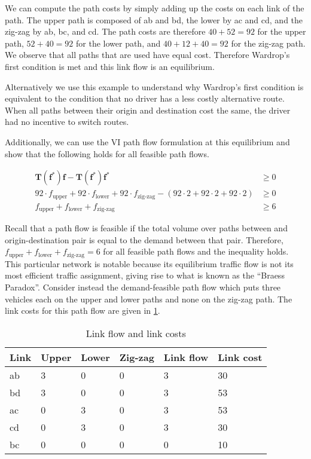 We can compute the path costs by simply adding up the costs on each link of the path.
The upper path is composed of ab and bd, the lower by ac and cd, and the zig-zag by ab, bc, and cd.
The path costs are therefore $40+52=92$ for the upper path, $52+40=92$ for the lower path, and $40+12+40=92$ for the zig-zag path.
We observe that all paths that are used have equal cost.
Therefore Wardrop's first condition is met and this link flow is an equilibrium.

Alternatively we use this example to understand why Wardrop's first condition is equivalent to the condition that no driver has a less costly alternative route.
When all paths between their origin and destination cost the same, the driver had no incentive to switch routes.

Additionally, we can use the VI path flow formulation at this equilibrium and show that the following holds for all feasible path flows.

\begin{align*}
    \mathbf{T}(\mathbf{f}^*)\mathbf{f} - \mathbf{T}(\mathbf{f}^*)\mathbf{f}^* &\geq 0\\
    92\cdot f_{\text{upper}} + 92\cdot f_{\text{lower}} + 92 \cdot f_{\text{zig-zag}} - (92\cdot 2 + 92\cdot 2 + 92\cdot 2) &\geq 0\\
    f_{\text{upper}} + f_{\text{lower}} + f_{\text{zig-zag}} &\geq 6
\end{align*}

Recall that a path flow is feasible if the total volume over paths between and origin-destination pair is equal to the demand between that pair.
Therefore, $f_{\text{upper}} + f_{\text{lower}} + f_{\text{zig-zag}}=6$ for all feasible path flows and the inequality holds.\\


This particular network is notable because its equilibrium traffic flow is not its most efficient traffic assignment, giving rise to what is known as the ``Braess Paradox''.
Consider instead the demand-feasible path flow which puts three vehicles each on the upper and lower paths and none on the zig-zag path.
The link costs for this path flow are given in \cref{tab:braess:optimal-costs}.

\begin{table}[!ht]
\centering
\caption{Link flow and link costs}\label{tab:braess:optimal-costs}
\begin{tabular}{@{}l|lll|ll@{}}
\toprule
Link & Upper & Lower & Zig-zag & Link flow & Link cost \\ \midrule
ab   & 3     & 0     & 0       & 3         & 30        \\
bd   & 3     & 0     & 0       & 3         & 53        \\
ac   & 0     & 3     & 0       & 3         & 53        \\
cd   & 0     & 3     & 0       & 3         & 30        \\
bc   & 0     & 0     & 0       & 0         & 10        \\ \bottomrule
\end{tabular}
\end{table}

